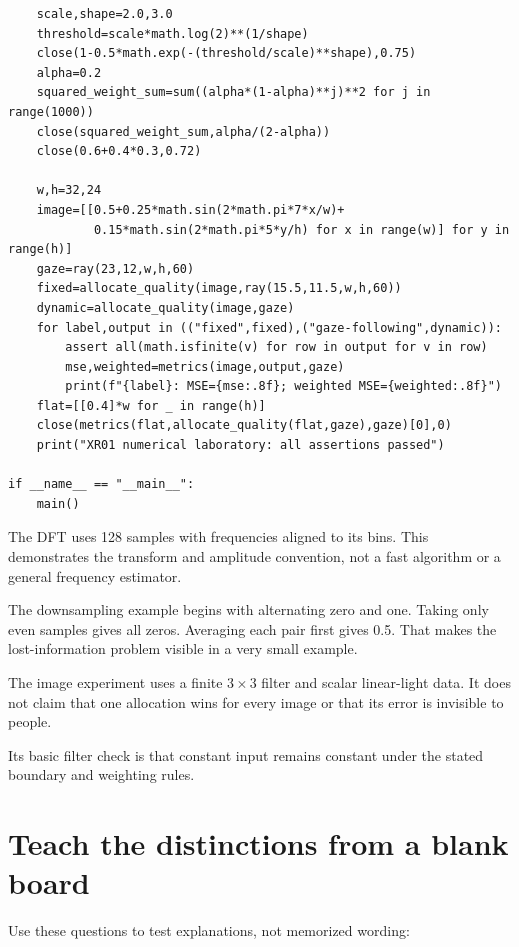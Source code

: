 \begin{verbatim}
    scale,shape=2.0,3.0
    threshold=scale*math.log(2)**(1/shape)
    close(1-0.5*math.exp(-(threshold/scale)**shape),0.75)
    alpha=0.2
    squared_weight_sum=sum((alpha*(1-alpha)**j)**2 for j in range(1000))
    close(squared_weight_sum,alpha/(2-alpha))
    close(0.6+0.4*0.3,0.72)

    w,h=32,24
    image=[[0.5+0.25*math.sin(2*math.pi*7*x/w)+
            0.15*math.sin(2*math.pi*5*y/h) for x in range(w)] for y in range(h)]
    gaze=ray(23,12,w,h,60)
    fixed=allocate_quality(image,ray(15.5,11.5,w,h,60))
    dynamic=allocate_quality(image,gaze)
    for label,output in (("fixed",fixed),("gaze-following",dynamic)):
        assert all(math.isfinite(v) for row in output for v in row)
        mse,weighted=metrics(image,output,gaze)
        print(f"{label}: MSE={mse:.8f}; weighted MSE={weighted:.8f}")
    flat=[[0.4]*w for _ in range(h)]
    close(metrics(flat,allocate_quality(flat,gaze),gaze)[0],0)
    print("XR01 numerical laboratory: all assertions passed")

if __name__ == "__main__":
    main()
\end{verbatim}

The DFT uses 128 samples with frequencies aligned to its bins. This demonstrates the transform and amplitude convention, not a fast algorithm or a general frequency estimator.

The downsampling example begins with alternating zero and one. Taking only even samples gives all zeros. Averaging each pair first gives 0.5. That makes the lost-information problem visible in a very small example.

The image experiment uses a finite \(3\times3\) filter and scalar linear-light data. It does not claim that one allocation wins for every image or that its error is invisible to people.

Its basic filter check is that constant input remains constant under the stated boundary and weighting rules.

\section{Teach the distinctions from a blank board}\label{04-visual-computing-ii-ch043-teach-the-distinctions-from-a-blank-board}

Use these questions to test explanations, not memorized wording:

